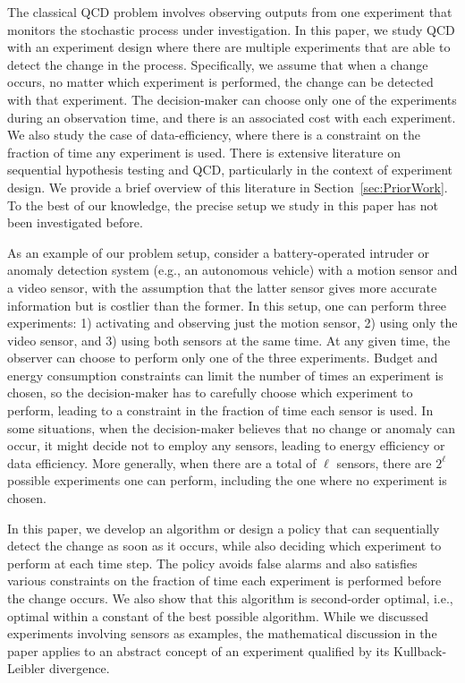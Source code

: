 \documentclass[journal, onecolumn]{IEEEtran}
\begin{document}
The classical QCD problem involves observing outputs from one experiment that monitors the stochastic process under investigation. In this paper, we study QCD with an experiment design where there are multiple experiments that are able to detect the change in the process. Specifically, we assume that when a change occurs, no matter which experiment is performed, the change can be detected with that experiment. The decision-maker can choose only one of the experiments during an observation time, and there is an associated cost with each experiment. We also study the case of data-efficiency, where there is a constraint on the fraction of time any experiment is used. There is extensive literature on sequential hypothesis testing and QCD, particularly in the context of experiment design. We provide a brief overview of this literature in Section~\ref{sec:PriorWork}. To the best of our knowledge, the precise setup we study in this paper has not been investigated before. 

As an example of our problem setup, consider a battery-operated intruder or anomaly detection system (e.g., an autonomous vehicle) with a motion sensor and a video sensor, with the assumption that the latter sensor gives more accurate information but is costlier than the former. In this setup, one can perform three experiments: 1) activating and observing just the motion sensor, 2) using only the video sensor, and 3) using both sensors at the same time. At any given time, the observer can choose to perform only one of the three experiments. Budget and energy consumption constraints can limit the number of times an experiment is chosen, so the decision-maker has to carefully choose which experiment to perform, leading to a constraint in the fraction of time each sensor is used. In some situations, when the decision-maker believes that no change or anomaly can occur, it might decide not to employ any sensors, leading to energy efficiency or data efficiency. More generally, when there are a total of $\ell$ sensors, there are $2^{\ell}$ possible experiments one can perform, including the one where no experiment is chosen. 

In this paper, we develop an algorithm or design a policy that can sequentially detect the change as soon as it occurs, while also deciding which experiment to perform at each time step. The policy avoids false alarms and also satisfies various constraints on the fraction of time each experiment is performed before the change occurs. We also show that this algorithm is second-order optimal, i.e., optimal within a constant of the best possible algorithm. While we discussed experiments involving sensors as examples, the mathematical discussion in the paper applies to an abstract concept of an experiment qualified by its Kullback-Leibler divergence. 
\end{document}
